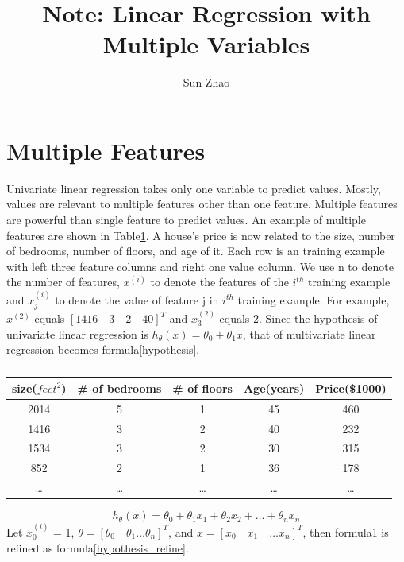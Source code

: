 \documentclass{article}
\title{Note: Linear Regression with Multiple Variables}
\author{Sun Zhao}
\begin{document}
\maketitle
\newpage

\section{Multiple Features}
Univariate linear regression takes only one variable to predict values. Mostly, values are relevant to multiple features other than one feature. Multiple features are powerful than single
 feature to predict values. An example of multiple features are shown in Table\ref{multivate_feature_example}. A house's price is now related to the size, number of bedrooms, number of floors, and age of it. Each row is an training example with left three feature columns and right one value column. We use n to denote the number of features, $x^{(i)}$ to denote the features of the $i^{th}$ training example and $x^{(i)}_{j}$ to denote the value of feature j in $i^{th}$ training example. For example, $x^{(2)}$ equals $[1416 \quad 3 \quad 2 \quad 40]^{T}$ and $x^{(2)}_{3}$ equals 2. Since the hypothesis of univariate linear regression is $h_{\theta}(x) = \theta_{0} + \theta_{1}x$, that of multivariate linear regression becomes formula\ref{hypothesis}.
 
\begin{table}[ht]
\begin{center}
\caption{}\label{multivate_feature_example}
\begin{tabular}{c|c|c|c|c}
\hline
size($feet^{2}$) & \# of bedrooms & \# of floors & Age(years) & Price(\$1000)\\
\hline
2014    &   5   &   1   &   45  &   460\\
1416    &   3   &   2   &   40  &   232\\
1534    &   3   &   2   &   30  &   315\\
852     &   2   &   1   &   36  &   178\\
\ldots & \ldots &  \ldots & \ldots & \ldots\\
\end{tabular}
\end{center}
\end{table}

\begin{equation}\label{hypothesis}
   h_{\theta}(x) = \theta_{0} + \theta_{1}x_{1} + \theta_{2}x_{2} + \ldots + \theta_{n}x_{n}
\end{equation}
Let $x^{(i)}_{0}$ = 1, $\theta = [\theta_{0} \quad \theta_{1} \ldots \theta_{n}]^{T}$, and $x = [x_{0} \quad x_{1} \quad \ldots x_{n}]^{T}$, then formula1 is refined as formula\ref{hypothesis_refine}.
\end{document}
